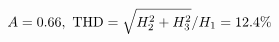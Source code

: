 \documentclass[preview]{standalone}
\begin{document}
\begin{align*}
\special{dvisvgm:raw <g id='unique000'>}A=0.66,\ \text{THD}=\sqrt{H_2^2+H_3^2}/H_1=12.4\%\special{dvisvgm:raw </g>}
\end{align*}
\end{document}
